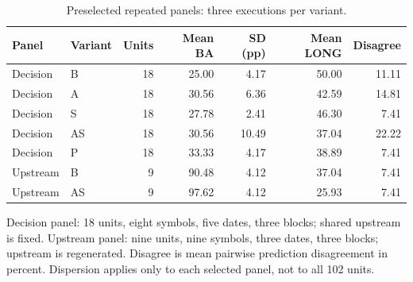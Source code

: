 \begin{table}[htbp]
\centering\small
\caption{Preselected repeated panels: three executions per variant.}
\label{tab:r1_common_panels}
\setlength{\tabcolsep}{3.5pt}
\begin{tabular}{llrrrrr}
\hline
Panel & Variant & Units & Mean BA & SD (pp) & Mean LONG & Disagree \\
\hline
Decision & B & 18 & 25.00 & 4.17 & 50.00 & 11.11 \\
Decision & A & 18 & 30.56 & 6.36 & 42.59 & 14.81 \\
Decision & S & 18 & 27.78 & 2.41 & 46.30 & 7.41 \\
Decision & AS & 18 & 30.56 & 10.49 & 37.04 & 22.22 \\
Decision & P & 18 & 33.33 & 4.17 & 38.89 & 7.41 \\
Upstream & B & 9 & 90.48 & 4.12 & 37.04 & 7.41 \\
Upstream & AS & 9 & 97.62 & 4.12 & 25.93 & 7.41 \\
\hline
\end{tabular}
\par\smallskip\footnotesize Decision panel: 18 units, eight symbols, five dates, three blocks; shared upstream is fixed. Upstream panel: nine units, nine symbols, three dates, three blocks; upstream is regenerated. Disagree is mean pairwise prediction disagreement in percent. Dispersion applies only to each selected panel, not to all 102 units.
\end{table}
